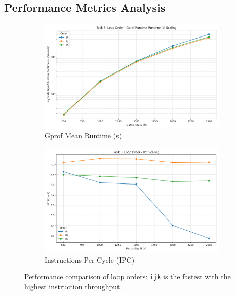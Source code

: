 \documentclass[11pt, a4paper]{article}
\begin{document}
\subsection{Performance Metrics Analysis}

\begin{figure}[h] %
    \centering
    \begin{subfigure}[b]{0.48\textwidth}
        \centering
        \includegraphics[width=\textwidth]{plots/task_3_loop_order_-__gprof_runtime_mean_s.png}
        \caption{Gprof Mean Runtime (s)}
        \label{fig:t3_runtime_order}
    \end{subfigure}
    \hfill
    \begin{subfigure}[b]{0.48\textwidth}
        \centering
        \includegraphics[width=\textwidth]{plots/task_3_loop_order_-__ipc.png}
        \caption{Instructions Per Cycle (IPC)}
        \label{fig:t3_ipc_order}
    \end{subfigure}
    \caption{Performance comparison of loop orders: \texttt{ijk} is the fastest with the highest instruction throughput.}
\end{figure}
\end{document}
